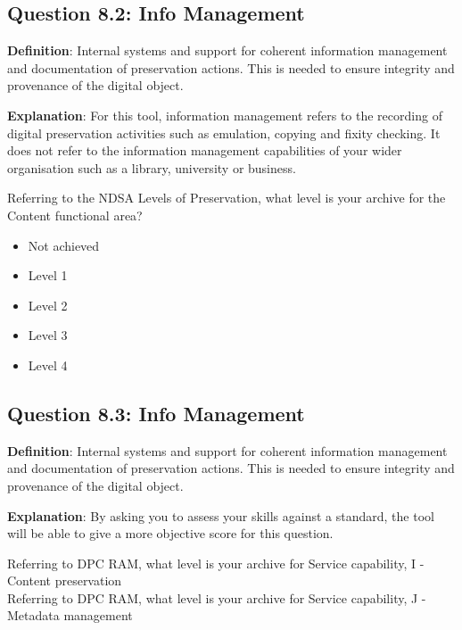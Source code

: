 \documentclass[a4paper,oneside]{article}
\providecommand{\tightlist}{%
    \setlength{\itemsep}{2pt}\setlength{\parskip}{0pt}}
\begin{document}
\begin{landscape}
\newpage

\hypertarget{question-8.2-info-management}{%
\subsection{Question 8.2: Info Management}\label{question-8.2-info-management}}

\textbf{Definition}: Internal systems and support for coherent information management and documentation of preservation actions. This is needed to ensure integrity and provenance of the digital object.

\textbf{Explanation}: For this tool, information management refers to the recording of digital preservation activities such as emulation, copying and fixity checking. It does not refer to the information management capabilities of your wider organisation such as a library, university or business.

Referring to the NDSA Levels of Preservation, what level is your archive for the Content functional area?

\begin{itemize}
\tightlist
\item
  Not achieved\\
\item
  Level 1\\
\item
  Level 2\\
\item
  Level 3\\
\item
  Level 4
\end{itemize}

\newpage

\hypertarget{question-8.3-info-management}{%
\subsection{Question 8.3: Info Management}\label{question-8.3-info-management}}

\textbf{Definition}: Internal systems and support for coherent information management and documentation of preservation actions. This is needed to ensure integrity and provenance of the digital object.

\textbf{Explanation}: By asking you to assess your skills against a standard, the tool will be able to give a more objective score for this question.

Referring to DPC RAM, what level is your archive for Service capability, I - Content preservation\\
Referring to DPC RAM, what level is your archive for Service capability, J - Metadata management


\end{landscape}
\end{document}
